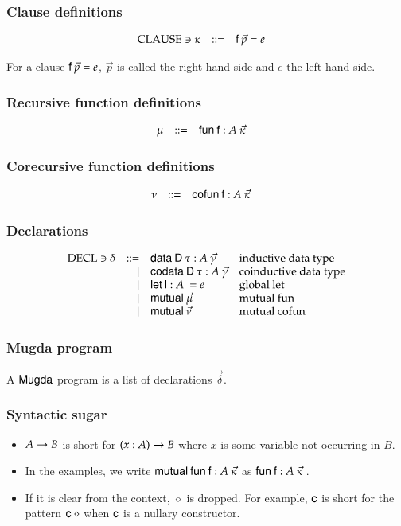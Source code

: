 \subsubsection{Clause definitions}
\[
\begin{array}{lrll}
\operatorname{CLAUSE} \ni \kappa & ::= & \mathsf{f} \: \vec{p} = e & 
\end{array}
\]

\noindent For a clause $\mathsf{f} \: \vec{p} = e$, $\vec{p}$ is called the right hand side and $e$ the left hand side. 

\subsubsection{Recursive function definitions}
\[
\begin{array}{lrll}
\mu & ::= & \mathsf{fun}\: \mathsf{f} : A \: \vec{\kappa} & 
\end{array}
\]

\subsubsection{Corecursive function definitions}
\[
\begin{array}{lrll}
\nu & ::= & \mathsf{cofun}\: \mathsf{f} : A \: \vec{\kappa} & 
\end{array}
\]

\subsubsection{Declarations}
\[
\begin{array}{lrll}
\operatorname{DECL} \ni \delta & ::= & \mathsf{data}\: \mathsf{D} \: \tau : A \: \vec{\gamma} & \mbox{inductive data type}\\ 
& \mid & \mathsf{codata}\: \mathsf{D} \: \tau : A \: \vec{\gamma} & \mbox{coinductive data type} \\
& \mid & \mathsf{let}\: \mathsf{l} : A \: = e & \mbox{global let}\\
& \mid & \mathsf{mutual}\: \vec{\mu} & \mbox{mutual fun }\\
& \mid & \mathsf{mutual}\: \vec{\nu} & \mbox{mutual cofun}
\end{array}
\]


\subsubsection{Mugda program}
A $\textsf{Mugda}$ program is a list of declarations $\vec{\delta}$.

\subsubsection{Syntactic sugar}
\begin{itemize}
\item
$A \rightarrow B$ is short for $( x : A ) \rightarrow{B}$ where $x$ is some variable not occurring in $B$.
\item
In the examples, we write $\mathsf{mutual}\: \mathsf{fun}\: \mathsf{f} : A \: \vec{\kappa} $ as $\mathsf{fun}\: \mathsf{f} : A \: \vec{\kappa}\:$.
\item
If it is clear from the context, $\diamond$ is dropped. For example, $\mathsf{c}$ is short for the pattern $\mathsf{c} \: \diamond$ when $\mathsf{c}$ is a nullary constructor.
\end{itemize}

